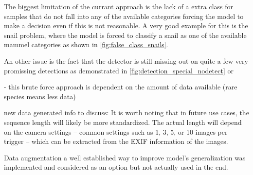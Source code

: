 The biggest limitation of the currant approach is the lack of a extra class for samples that do not fall into any of the available categories forcing the model to make a decision even if this is not reasonable.
A very good example for this is the snail problem, where the model is forced to classify a snail as one of the available mammel categories as shown in \autoref{fig:false_class_snails}.

An other issue is the fact that the detector is still missing out on quite a few very promissing detections as demonstrated in \autoref{fig:detection_special_nodetect} or 


- this brute force approach is dependent on the amount of data available (rare species means less data)


new data generated info to discuss:
It is worth noting that in future use cases, the sequence length will likely be more standardized.
The actual length will depend on the camera settings -- common settings such as 1, 3, 5, or 10 images per trigger -- which can be extracted from the EXIF information of the images.

Data augmentation a well established way to improve model's generalization \autocite{shortenSurveyImageData2019} was implemented and considered as an option but not actually used in the end.